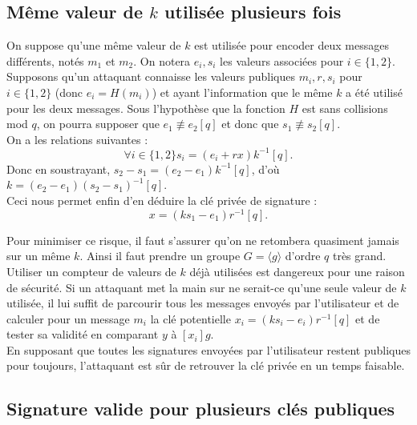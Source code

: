 \documentclass{article}
\begin{document}
\subsection{Même valeur de $k$ utilisée plusieurs fois}

On suppose qu'une même valeur de $k$ est utilisée pour encoder deux messages différents, notés $m_1$ et $m_2$. On notera $e_i, s_i$ les valeurs associées pour $i\in \{1,2\}$. Supposons qu'un attaquant connaisse les valeurs publiques $m_i,r,s_i$ pour $i\in\{1,2\}$ (donc $e_i = H(m_i)$) et ayant l'information que le même $k$ a été utilisé pour les deux messages. Sous l'hypothèse que la fonction $H$ est sans collisions mod $q$, on pourra supposer que $e_1\not \equiv e_2 [q]$ et donc que $s_1\not \equiv s_2 [q]$.\\
On a les relations suivantes :
\[\forall i\in \{1,2\} s_i = (e_i + rx)k^{-1} [q].\]
Donc en soustrayant, $s_2 - s_1 = (e_2 - e_1)k^{-1} [q]$, d'où $k = (e_2-e_1)(s_2-s_1)^{-1} [q]$.\\
Ceci nous permet enfin d'en déduire la clé privée de signature :
\[x = (ks_1-e_1)r^{-1} [q].\]

Pour minimiser ce risque, il faut s'assurer qu'on ne retombera quasiment jamais sur un même $k$. Ainsi il faut prendre un groupe $G = \langle g\rangle$ d'ordre $q$ très grand.\\

Utiliser un compteur de valeurs de $k$ déjà utilisées est dangereux pour une raison de sécurité. Si un attaquant met la main sur ne serait-ce qu'une seule valeur de $k$ utilisée, il lui suffit de parcourir tous les messages envoyés par l'utilisateur et de calculer pour un message $m_i$ la clé potentielle $x_i = (ks_i-e_i)r^{-1} [q]$ et de tester sa validité en comparant $y$ à $[x_i]g$.\\
En supposant que toutes les signatures envoyées par l'utilisateur restent publiques pour toujours, l'attaquant est sûr de retrouver la clé privée en un temps faisable.

\subsection{}

\subsection{Signature valide pour plusieurs clés publiques}
\end{document}
